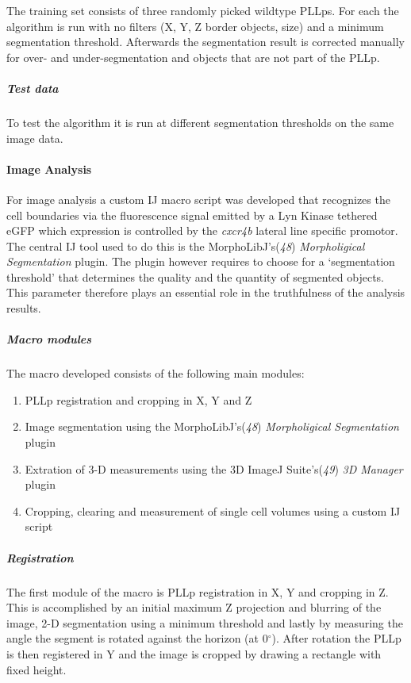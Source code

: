 \documentclass[11pt,singlespacinge,twoside]{reedthesis} %
\providecommand{\tightlist}{%
  \setlength{\itemsep}{0pt}\setlength{\parskip}{0pt}}
\def\labelenumi{\arabic{enumi}.}
\begin{document}
The training set consists of three randomly picked wildtype PLLps. For each the algorithm is run with no filters (X, Y, Z border objects, size) and a minimum segmentation threshold. Afterwards the segmentation result is corrected manually for over- and under-segmentation and objects that are not part of the PLLp.

\hypertarget{test-data-1}{%
\subparagraph{Test data}\label{test-data-1}}

To test the algorithm it is run at different segmentation thresholds on the same image data.

\hypertarget{image-analysis-1}{%
\paragraph{Image Analysis}\label{image-analysis-1}}

For image analysis a custom IJ macro script was developed that recognizes the cell boundaries via the fluorescence signal emitted by a Lyn Kinase tethered eGFP which expression is controlled by the \emph{cxcr4b} lateral line specific promotor. The central IJ tool used to do this is the MorphoLibJ's(\emph{48}) \emph{Morpholigical Segmentation} plugin. The plugin however requires to choose for a `segmentation threshold' that determines the quality and the quantity of segmented objects. This parameter therefore plays an essential role in the truthfulness of the analysis results.

\hypertarget{macro-modules-1}{%
\subparagraph{Macro modules}\label{macro-modules-1}}

The macro developed consists of the following main modules:
\begin{enumerate}
\def\labelenumi{\arabic{enumi}.}
\tightlist
\item
  PLLp registration and cropping in X, Y and Z
\item
  Image segmentation using the MorphoLibJ's(\emph{48}) \emph{Morpholigical Segmentation} plugin
\item
  Extration of 3-D measurements using the 3D ImageJ Suite's(\emph{49}) \emph{3D Manager} plugin
\item
  Cropping, clearing and measurement of single cell volumes using a custom IJ script
\end{enumerate}
\hypertarget{registration}{%
\subparagraph{Registration}\label{registration}}

The first module of the macro is PLLp registration in X, Y and cropping in Z. This is accomplished by an initial maximum Z projection and blurring of the image, 2-D segmentation using a minimum threshold and lastly by measuring the angle the segment is rotated against the horizon (at 0\(^{\circ}\)). After rotation the PLLp is then registered in Y and the image is cropped by drawing a rectangle with fixed height.
\end{document}

